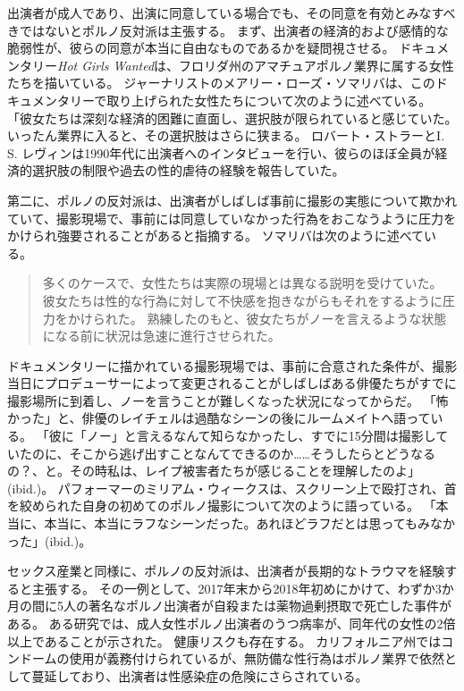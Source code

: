 \documentclass[paper=a4,book,openany]{jlreq} \usepackage{mystyle}
\begin{document}
出演者が成人であり、出演に同意している場合でも、その同意を有効とみなすべきではないとポルノ反対派は主張する。
まず、出演者の経済的および感情的な脆弱性が、彼らの同意が本当に自由なものであるかを疑問視させる。
ドキュメンタリー\emph{Hot Girls Wanted}は、フロリダ州のアマチュアポルノ業界に属する女性たちを描いている。
ジャーナリストのメアリー・ローズ・ソマリバは、このドキュメンタリーで取り上げられた女性たちについて次のように述べている。
「彼女たちは深刻な経済的困難に直面し、選択肢が限られていると感じていた。
いったん業界に入ると、その選択肢はさらに狭まる\citep{somarriba15:_porn_indus_is_abusiv_these}。
ロバート・ストラーとI. S. レヴィンは1990年代に出演者へのインタビューを行い、彼らのほぼ全員が経済的選択肢の制限や過去の性的虐待の経験を報告していた\citep{stoller93:_comin_attrac}。

第二に、ポルノの反対派は、出演者がしばしば事前に撮影の実態について欺かれていて、撮影現場で、事前には同意していなかった行為をおこなうように圧力をかけられ強要されることがあると指摘する。
ソマリバは次のように述べている。

\begin{quote}
多くのケースで、女性たちは実際の現場とは異なる説明を受けていた。
彼女たちは性的な行為に対して不快感を抱きながらもそれをするように圧力をかけられた。
熟練したのもと、彼女たちがノーを言えるような状態になる前に状況は急速に進行させられた。
\citep{somarriba15:_porn_indus_is_abusiv_these}
\end{quote}

ドキュメンタリーに描かれている撮影現場では、事前に合意された条件が、撮影当日にプロデューサーによって変更されることがしばしばある{\DDASH}俳優たちがすでに撮影場所に到着し、ノーを言うことが難しくなった状況になってからだ。
「怖かった」と、俳優のレイチェルは過酷なシーンの後にルームメイトへ語っている。
「彼に「ノー」と言えるなんて知らなかったし、すでに15分間は撮影していたのに、そこから逃げ出すことなんてできるのか……そうしたらとどうなるの？、と。その時私は、レイプ被害者たちが感じることを理解したのよ」(ibid.)。
パフォーマーのミリアム・ウィークスは、スクリーン上で殴打され、首を絞められた自身の初めてのポルノ撮影について次のように語っている。
「本当に、本当に、本当にラフなシーンだった。あれほどラフだとは思ってもみなかった」(ibid.)。

セックス産業と同様に、ポルノの反対派は、出演者が長期的なトラウマを経験すると主張する。
その一例として、2017年末から2018年初めにかけて、わずか3か月の間に5人の著名なポルノ出演者が自殺または薬物過剰摂取で死亡した事件がある。
ある研究では、成人女性ポルノ出演者のうつ病率が、同年代の女性の2倍以上であることが示された\citep{grudzen01:_compar_mental_healt_femal_adult}。
健康リスクも存在する。
カリフォルニア州ではコンドームの使用が義務付けられているが、無防備な性行為はポルノ業界で依然として蔓延しており、出演者は性感染症の危険にさらされている\citep{coyne09:_sexual_healt_adult_workin_pornog_films}。
\end{document}
